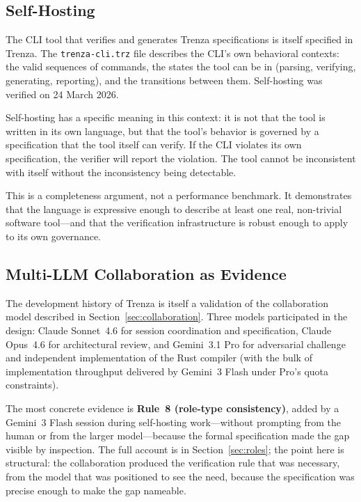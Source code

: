 \subsection{Self-Hosting}
\label{sec:selfhosting}

The CLI tool that verifies and generates Trenza specifications is itself
specified in Trenza. The \texttt{trenza-cli.trz} file describes the CLI's own
behavioral contexts: the valid sequences of commands, the states the tool can
be in (parsing, verifying, generating, reporting), and the transitions between
them. Self-hosting was verified on 24 March 2026.

Self-hosting has a specific meaning in this context: it is not that the tool is
written in its own language, but that the tool's behavior is governed by a
specification that the tool itself can verify. If the CLI violates its own
specification, the verifier will report the violation. The tool cannot be
inconsistent with itself without the inconsistency being detectable.

This is a completeness argument, not a performance benchmark. It demonstrates
that the language is expressive enough to describe at least one real, non-trivial
software tool---and that the verification infrastructure is robust enough to
apply to its own governance.

\subsection{Multi-LLM Collaboration as Evidence}
\label{sec:collab-evidence}

The development history of Trenza is itself a validation of the collaboration
model described in Section~\ref{sec:collaboration}. Three models participated
in the design: Claude Sonnet~4.6 for session coordination and specification,
Claude Opus~4.6 for architectural review, and Gemini~3.1 Pro for adversarial
challenge and independent implementation of the Rust compiler (with the bulk
of implementation throughput delivered by Gemini~3 Flash under Pro's quota
constraints).

The most concrete evidence is \textbf{Rule~8 (role-type consistency)}, added
by a Gemini~3 Flash session during self-hosting work---without prompting from the
human or from the larger model---because the formal specification made the gap
visible by inspection. The full account is in Section~\ref{sec:roles}; the
point here is structural: the collaboration produced the verification rule that
was necessary, from the model that was positioned to see the need, because the
specification was precise enough to make the gap nameable.

